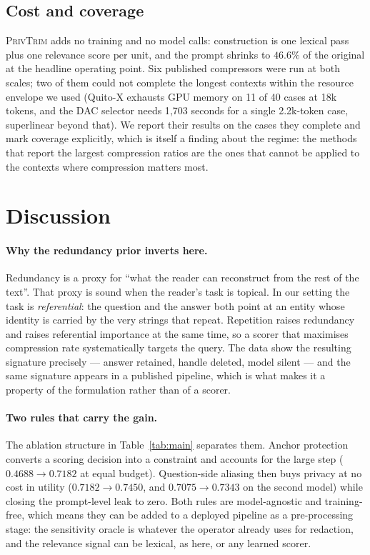 \documentclass[conference]{IEEEtran}
\newcommand{\ours}{\textsc{PrivTrim}}
\begin{document}
\subsection{Cost and coverage}
\label{sec:res-cost}

\ours{} adds no training and no model calls: construction is one lexical pass plus one relevance
score per unit, and the prompt shrinks to $46.6\%$ of the original at the headline operating
point. Six published compressors were run at both scales; two of them could not complete the
longest contexts within the resource envelope we used (Quito-X exhausts GPU memory on 11 of 40
cases at 18k tokens, and the DAC selector needs 1{,}703 seconds for a single 2.2k-token case,
superlinear beyond that). We report their results on the cases they complete and mark coverage
explicitly, which is itself a finding about the regime: the methods that report the largest
compression ratios are the ones that cannot be applied to the contexts where compression
matters most.

\section{Discussion}
\label{sec:disc}

\paragraph{Why the redundancy prior inverts here.}
Redundancy is a proxy for ``what the reader can reconstruct from the rest of the text''. That
proxy is sound when the reader's task is topical. In our setting the task is
\emph{referential}: the question and the answer both point at an entity whose identity is
carried by the very strings that repeat. Repetition raises redundancy and raises referential
importance at the same time, so a scorer that maximises compression rate systematically targets
the query. The data show the resulting signature precisely --- answer retained, handle deleted,
model silent --- and the same signature appears in a published pipeline, which is what makes it
a property of the formulation rather than of a scorer.

\paragraph{Two rules that carry the gain.}
The ablation structure in Table~\ref{tab:main} separates them. Anchor protection converts a
scoring decision into a constraint and accounts for the large step
($0.4688\!\to\!0.7182$ at equal budget). Question-side aliasing then buys privacy at no cost in
utility ($0.7182\!\to\!0.7450$, and $0.7075\!\to\!0.7343$ on the second model) while closing the
prompt-level leak to zero. Both rules are model-agnostic and training-free, which means they can
be added to a deployed pipeline as a pre-processing stage: the sensitivity oracle is whatever
the operator already uses for redaction, and the relevance signal can be lexical, as here, or
any learned scorer.
\end{document}
